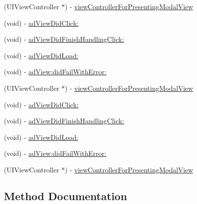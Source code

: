 \begin{DoxyCompactItemize}
\item 
(U\+I\+View\+Controller $\ast$) -\/ \hyperlink{protocolFBAdViewDelegate_01-p_abb65fb95527f0571d4a298beb1e6e299}{view\+Controller\+For\+Presenting\+Modal\+View}
\item 
(void) -\/ \hyperlink{protocolFBAdViewDelegate_01-p_a7842ffc41d5df660da7238e182ff634a}{ad\+View\+Did\+Click\+:}
\item 
(void) -\/ \hyperlink{protocolFBAdViewDelegate_01-p_a7fb041c26e7163226dfc7f2565c543b6}{ad\+View\+Did\+Finish\+Handling\+Click\+:}
\item 
(void) -\/ \hyperlink{protocolFBAdViewDelegate_01-p_a77334fc3e7bcc1f4ed61e1fbd372359a}{ad\+View\+Did\+Load\+:}
\item 
(void) -\/ \hyperlink{protocolFBAdViewDelegate_01-p_a2fc4eecd46ddc75a41e925c9b07d25b8}{ad\+View\+:did\+Fail\+With\+Error\+:}
\item 
(U\+I\+View\+Controller $\ast$) -\/ \hyperlink{protocolFBAdViewDelegate_01-p_abb65fb95527f0571d4a298beb1e6e299}{view\+Controller\+For\+Presenting\+Modal\+View}
\item 
(void) -\/ \hyperlink{protocolFBAdViewDelegate_01-p_a7842ffc41d5df660da7238e182ff634a}{ad\+View\+Did\+Click\+:}
\item 
(void) -\/ \hyperlink{protocolFBAdViewDelegate_01-p_a7fb041c26e7163226dfc7f2565c543b6}{ad\+View\+Did\+Finish\+Handling\+Click\+:}
\item 
(void) -\/ \hyperlink{protocolFBAdViewDelegate_01-p_a77334fc3e7bcc1f4ed61e1fbd372359a}{ad\+View\+Did\+Load\+:}
\item 
(void) -\/ \hyperlink{protocolFBAdViewDelegate_01-p_a2fc4eecd46ddc75a41e925c9b07d25b8}{ad\+View\+:did\+Fail\+With\+Error\+:}
\item 
(U\+I\+View\+Controller $\ast$) -\/ \hyperlink{protocolFBAdViewDelegate_01-p_abb65fb95527f0571d4a298beb1e6e299}{view\+Controller\+For\+Presenting\+Modal\+View}
\end{DoxyCompactItemize}


\subsection{Method Documentation}
\mbox{\label{protocolFBAdViewDelegate_01-p_a2fc4eecd46ddc75a41e925c9b07d25b8}} 
